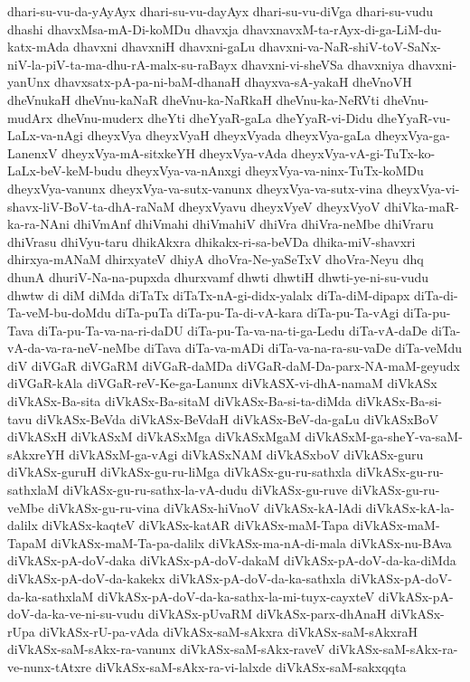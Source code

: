 {dhari-su-vu-da-yAyAyx
dhari-su-vu-dayAyx
dhari-su-vu-diVga
dhari-su-vudu
dhashi
dhavxMsa-mA-Di-koMDu
dhavxja
dhavxnavxM-ta-rAyx-di-ga-LiM-du-katx-mAda
dhavxni
dhavxniH
dhavxni-gaLu
dhavxni-va-NaR-shiV-toV-SaNx-niV-la-piV-ta-ma-dhu-rA-malx-su-raBayx
dhavxni-vi-sheVSa
dhavxniya
dhavxni-yanUnx
dhavxsatx-pA-pa-ni-baM-dhanaH
dhayxva-sA-yakaH
dheVnoVH
dheVnukaH
dheVnu-kaNaR
dheVnu-ka-NaRkaH
dheVnu-ka-NeRVti
dheVnu-mudArx
dheVnu-muderx
dheYti
dheYyaR-gaLa
dheYyaR-vi-Didu
dheYyaR-vu-LaLx-va-nAgi
dheyxVya
dheyxVyaH
dheyxVyada
dheyxVya-gaLa
dheyxVya-ga-LanenxV
dheyxVya-mA-sitxkeYH
dheyxVya-vAda
dheyxVya-vA-gi-TuTx-ko-LaLx-beV-keM-budu
dheyxVya-va-nAnxgi
dheyxVya-va-ninx-TuTx-koMDu
dheyxVya-vanunx
dheyxVya-va-sutx-vanunx
dheyxVya-va-sutx-vina
dheyxVya-vi-shavx-liV-BoV-ta-dhA-raNaM
dheyxVyavu
dheyxVyeV
dheyxVyoV
dhiVka-maR-ka-ra-NAni
dhiVmAnf
dhiVmahi
dhiVmahiV
dhiVra
dhiVra-neMbe
dhiVraru
dhiVrasu
dhiVyu-taru
dhikAkxra
dhikakx-ri-sa-beVDa
dhika-miV-shavxri
dhirxya-mANaM
dhirxyateV
dhiyA
dhoVra-Ne-yaSeTxV
dhoVra-Neyu
dhq
dhunA
dhuriV-Na-na-pupxda
dhurxvamf
dhwti
dhwtiH
dhwti-ye-ni-su-vudu
dhwtw
di
diM
diMda
diTaTx
diTaTx-nA-gi-didx-yalalx
diTa-diM-dipapx
diTa-di-Ta-veM-bu-doMdu
diTa-puTa
diTa-pu-Ta-di-vA-kara
diTa-pu-Ta-vAgi
diTa-pu-Tava
diTa-pu-Ta-va-na-ri-daDU
diTa-pu-Ta-va-na-ti-ga-Ledu
diTa-vA-daDe
diTa-vA-da-va-ra-neV-neMbe
diTava
diTa-va-mADi
diTa-va-na-ra-su-vaDe
diTa-veMdu
diV
diVGaR
diVGaRM
diVGaR-daMDa
diVGaR-daM-Da-parx-NA-maM-geyudx
diVGaR-kAla
diVGaR-reV-Ke-ga-Lanunx
diVkASX-vi-dhA-namaM
diVkASx
diVkASx-Ba-sita
diVkASx-Ba-sitaM
diVkASx-Ba-si-ta-diMda
diVkASx-Ba-si-tavu
diVkASx-BeVda
diVkASx-BeVdaH
diVkASx-BeV-da-gaLu
diVkASxBoV
diVkASxH
diVkASxM
diVkASxMga
diVkASxMgaM
diVkASxM-ga-sheY-va-saM-sAkxreYH
diVkASxM-ga-vAgi
diVkASxNAM
diVkASxboV
diVkASx-guru
diVkASx-guruH
diVkASx-gu-ru-liMga
diVkASx-gu-ru-sathxla
diVkASx-gu-ru-sathxlaM
diVkASx-gu-ru-sathx-la-vA-dudu
diVkASx-gu-ruve
diVkASx-gu-ru-veMbe
diVkASx-gu-ru-vina
diVkASx-hiVnoV
diVkASx-kA-lAdi
diVkASx-kA-la-dalilx
diVkASx-kaqteV
diVkASx-katAR
diVkASx-maM-Tapa
diVkASx-maM-TapaM
diVkASx-maM-Ta-pa-dalilx
diVkASx-ma-nA-di-mala
diVkASx-nu-BAva
diVkASx-pA-doV-daka
diVkASx-pA-doV-dakaM
diVkASx-pA-doV-da-ka-diMda
diVkASx-pA-doV-da-kakekx
diVkASx-pA-doV-da-ka-sathxla
diVkASx-pA-doV-da-ka-sathxlaM
diVkASx-pA-doV-da-ka-sathx-la-mi-tuyx-cayxteV
diVkASx-pA-doV-da-ka-ve-ni-su-vudu
diVkASx-pUvaRM
diVkASx-parx-dhAnaH
diVkASx-rUpa
diVkASx-rU-pa-vAda
diVkASx-saM-sAkxra
diVkASx-saM-sAkxraH
diVkASx-saM-sAkx-ra-vanunx
diVkASx-saM-sAkx-raveV
diVkASx-saM-sAkx-ra-ve-nunx-tAtxre
diVkASx-saM-sAkx-ra-vi-lalxde
diVkASx-saM-sakxqqta
}

